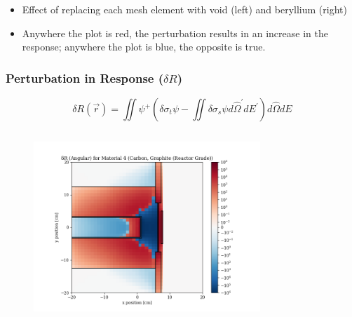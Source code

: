 \documentclass[t]{beamer}
\begin{document}
\begin{frame}
\begin{columns}
\begin{figure}
    \end{figure}
  \end{columns}
  \begin{itemize}
    \item Effect of replacing each mesh element with void (left) and beryllium
          (right)
    \item Anywhere the plot is red, the perturbation results in an increase in
          the response; anywhere the plot is blue, the opposite is true.
  \end{itemize}
\end{frame}

\begin{frame}
  \frametitle{Perturbation in Response ($\delta R$)}
  \vskip-0.25in
  \begin{equation*}
    \delta R\left(\vec{r}\right) = \iint\psi^+\left(\delta\sigma_t\psi - \iint\delta\sigma_s\psi d\hat{\Omega}^\prime dE^\prime\right)d\hat{\Omega}dE
  \end{equation*}
  \vskip-0.25in
  \begin{columns}
    \begin{figure}
      \includegraphics[trim={0.7in 0.15in 1.05in 0.4in},clip,scale=0.36]{images/dR_angular_04.png}
    \end{figure}
    \begin{figure}

\end{figure}
\end{columns}
\end{frame}
\end{document}
